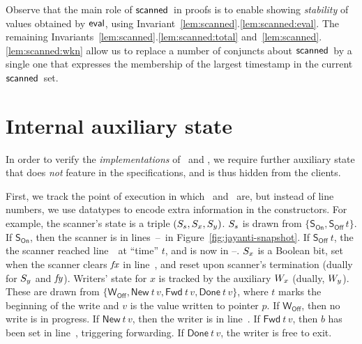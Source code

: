 \documentclass[a4paper,UKenglish]{lipics-v2016}
\newcommand{\wInit}{\mathsf{W_{Off}}}
\newcommand{\wWrite}{\mathsf{New}}
\newcommand{\wDirty}{\mathsf{Fwd}}
\newcommand{\wClean}{\mathsf{Done}}
\newcommand{\sOn}{\mathsf{S_{On}}}
\newcommand{\sOff}{\mathsf{S_{Off}}}
\theoremstyle{definition}
\begin{document}
Observe that the main role of $\scanned$ in proofs is to enable
showing \emph{stability} of values obtained by $\mathsf{eval}$, using
Invariant~\ref{lem:scanned}.\ref{lem:scanned:eval}. The remaining
Invariants~\ref{lem:scanned}.\ref{lem:scanned:total}
and~\ref{lem:scanned}.\ref{lem:scanned:wkn} allow us to replace a
number of conjuncts about $\scanned$ by a single one that expresses
the membership of the largest timestamp in the current $\scanned$ set.

%


\section{Internal auxiliary state}
\label{sc:auxiliaries}

In order to verify the \emph{implementations} of \jywrite~and \jyscan,
we require further auxiliary state that does \emph{not} feature in the
specifications, and is thus hidden from the clients.

First, we track the point of execution in which \jywrite~and
\jyscan~are, but instead of line numbers, we use datatypes to encode
extra information in the constructors.
%
For example, the scanner's state is a triple $(S_s, S_x,
S_y)$. $S_s$ is drawn from $\{ \sOn, \sOff\, t\}$. If $\sOn$, then
the scanner is in lines~\lineScanSetsS--\lineScanReadsY~in
Figure~\ref{fig:jayanti-snapshot}. If $\sOff\ t$, the the scanner
reached line~\lineScanUnsetsS~at ``time'' $t$, and is now in
\lineScanReadsFX--\lineScanRelinks. $S_x$ is a Boolean bit, set when
the scanner clears $\mathit{fx}$ in line~\lineScanClearsX, and reset upon
scanner's termination (dually for $S_y$ and $\mathit{fy}$).
%
Writers' state for $x$ is tracked by the auxiliary $W_x$ (dually,
$W_y$). These are drawn from $\{\wInit, \wWrite\ t\, v, \wDirty\ t\,
v, \wClean\ t\, v \}$, where $t$ marks the beginning of the write and
$v$ is the value written to pointer $p$. If $\wInit$, then no write is
in progress. If $\wWrite\ t\, v$, then the writer is in
line~\lineWrtWrt. If $\wDirty\ t\, v$, then $b$ has been set in
line~\lineWrtChk, triggering forwarding. If $\wClean\ t\, v$, the
writer is free to exit.
\end{document}
